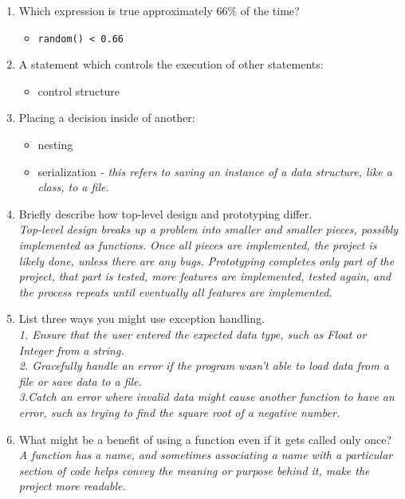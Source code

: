 \documentclass[letter,10pt]{article}
\newcommand*\tick{\item[\Checkmark]}
\newcommand*\fail{\item[\XSolidBrush]}
\begin{document}
\begin{enumerate}
    \item Which expression is true approximately 66\% of the time?
    \begin{itemize}
        \tick \verb|random() < 0.66|
    \end{itemize}

    \item A statement which controls the execution of other statements:
    \begin{itemize}
        \tick control structure
    \end{itemize}

    \item Placing a decision inside of another:
    \begin{itemize}
        \tick nesting
        \fail serialization \textit{- this refers to saving an instance of a data structure, like a class, to a file.}
    \end{itemize}

    \item Briefly describe how top-level design and prototyping differ. \\
    \textit{Top-level design breaks up a problem into smaller and smaller pieces, possibly implemented as functions. Once all pieces are implemented, the project is likely done, unless there are any bugs. Prototyping completes only part of the project, that part is tested, more features are implemented, tested again, and the process repeats until eventually all features are implemented.}

    \item List three ways you might use exception handling. \\
    \textit{1. Ensure that the user entered the expected data type, such as Float or Integer from a string.\\2. Gracefully handle an error if the program wasn't able to load data from a file or save data to a file.\\3.Catch an error where invalid data might cause another function to have an error, such as trying to find the square root of a negative number.}

    \item What might be a benefit of using a function even if it gets called only once? \\
    \textit{A function has a name, and sometimes associating a name with a particular section of code helps convey the meaning or purpose behind it, make the project more readable.}

\end{enumerate}
\end{document}
